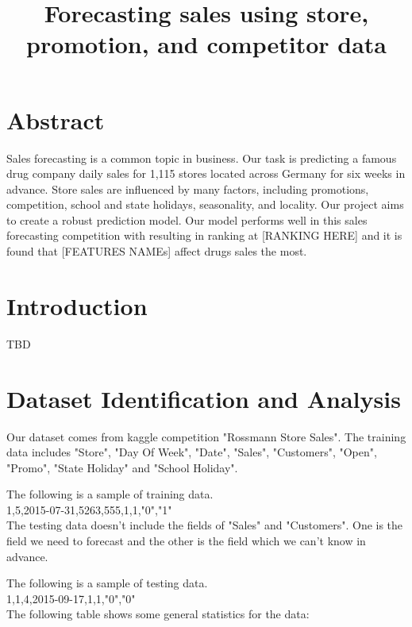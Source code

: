 \documentclass[jou,apacite]{apa6}
\title{Forecasting sales using store, promotion, and competitor data}
\begin{document}
\maketitle    
                        
\section{Abstract}
Sales forecasting is a common topic in business. Our task is predicting a famous drug company daily sales for 1,115 stores located across Germany for six weeks in advance. Store sales are influenced by many factors, including promotions, competition, school and state holidays, seasonality, and locality. Our project aims to create a robust prediction model. Our model performs well in this sales forecasting competition with resulting in ranking at [RANKING HERE] and it is found that [FEATURES NAMEs] affect drugs sales the most. 

\section{Introduction}

TBD

\section{Dataset Identification and Analysis}
Our dataset comes from kaggle competition "Rossmann Store Sales". The training data includes "Store", "Day Of Week", "Date", "Sales", "Customers", "Open", "Promo", "State Holiday" and "School Holiday". 

The following is a sample of training data.\\

1,5,2015-07-31,5263,555,1,1,"0","1"\\

The testing data doesn't include the fields of "Sales" and "Customers". One is the field we need to forecast and the other is the field which we can't know in advance. 

The following is a sample of testing data.\\

1,1,4,2015-09-17,1,1,"0","0"\\

The following table shows some general statistics for the data:
\end{document}
